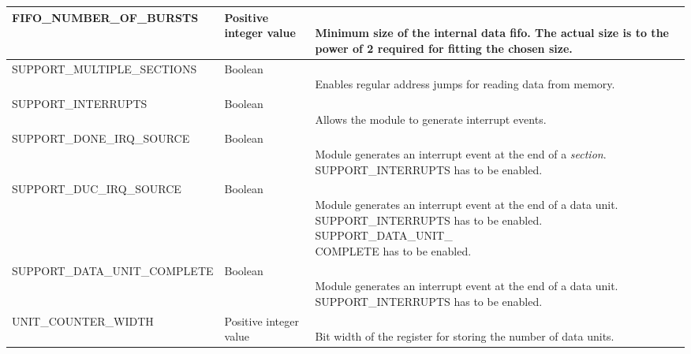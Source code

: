 \begin{longtable}[ht]{|l|l|l|}
    \small{FIFO\_NUMBER\_OF\_BURSTS} & Positive integer value & \parbox{5cm}{\ \\
        Minimum size of the internal data fifo. The actual size is to the power of 2 required for fitting the chosen size.\\
    }\\
    \hline
    
    \small{SUPPORT\_MULTIPLE\_SECTIONS} & Boolean & \parbox{5cm}{\ \\
        Enables regular address jumps for reading data from memory.\\
    }\\
    \hline
    
    
    \small{SUPPORT\_INTERRUPTS} & Boolean & \parbox{5cm}{\ \\
        Allows the module to generate interrupt events.\\
    }\\
    \hline
    
    \small{SUPPORT\_DONE\_IRQ\_SOURCE} & Boolean & \parbox{5cm}{\ \\
        Module generates an interrupt event at the end of a \textit{section}.\\
        \small{SUPPORT\_INTERRUPTS} has to be enabled.\\
    }\\
    \hline
    
    \small{SUPPORT\_DUC\_IRQ\_SOURCE} & Boolean & \parbox{5cm}{\ \\
        Module generates an interrupt event at the end of a data unit.\\
        \small{SUPPORT\_INTERRUPTS} has to be enabled.\\
        \small{SUPPORT\_DATA\_UNIT\_}\\
        \small{COMPLETE} has to be enabled.\\
    }\\
    \hline
    
    \small{SUPPORT\_DATA\_UNIT\_COMPLETE} & Boolean & \parbox{5cm}{\ \\
        Module generates an interrupt event at the end of a data unit.\\
        \small{SUPPORT\_INTERRUPTS} has to be enabled.\\
    }\\
    \hline
    
    \small{UNIT\_COUNTER\_WIDTH} & Positive integer value & \parbox{5cm}{\ \\
        Bit width of the register for storing the number of data units.\\
    }\\
    \hline
    
\end{longtable}

